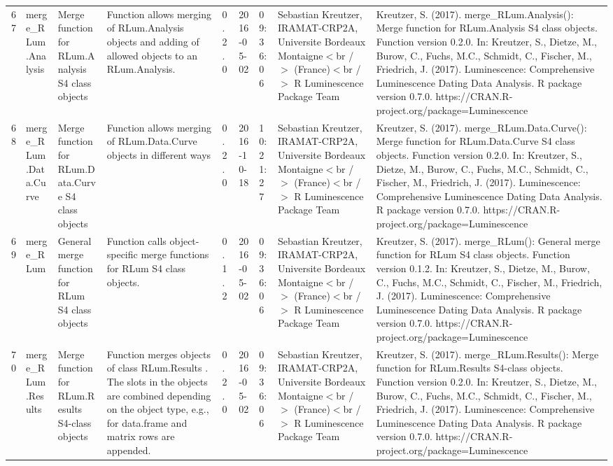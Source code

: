 \begin{table}[ht]
\begin{tabular}{rllllllll}
 \\ 
  67 & merge\_RLum.Analysis & Merge function for RLum.Analysis S4 class objects & Function allows merging of RLum.Analysis objects and adding of allowed objects to an RLum.Analysis. & 0.2.0 & 2016-05-02 & 09:36:06
 & Sebastian Kreutzer, IRAMAT-CRP2A, Universite Bordeaux Montaigne$<$br /$>$ (France)$<$br /$>$  R Luminescence Package Team & Kreutzer, S. (2017). merge\_RLum.Analysis(): Merge function for RLum.Analysis S4 class objects. Function version 0.2.0. In: Kreutzer, S., Dietze, M., Burow, C., Fuchs, M.C., Schmidt, C., Fischer, M., Friedrich, J. (2017). Luminescence: Comprehensive Luminescence Dating Data Analysis. R package version 0.7.0. https://CRAN.R-project.org/package=Luminescence
 \\ 
  68 & merge\_RLum.Data.Curve & Merge function for RLum.Data.Curve S4 class objects & Function allows merging of RLum.Data.Curve objects in different ways & 0.2.0 & 2016-10-18 & 10:21:27
 & Sebastian Kreutzer, IRAMAT-CRP2A, Universite Bordeaux Montaigne$<$br /$>$ (France)$<$br /$>$  R Luminescence Package Team & Kreutzer, S. (2017). merge\_RLum.Data.Curve(): Merge function for RLum.Data.Curve S4 class objects. Function version 0.2.0. In: Kreutzer, S., Dietze, M., Burow, C., Fuchs, M.C., Schmidt, C., Fischer, M., Friedrich, J. (2017). Luminescence: Comprehensive Luminescence Dating Data Analysis. R package version 0.7.0. https://CRAN.R-project.org/package=Luminescence
 \\ 
  69 & merge\_RLum & General merge function for RLum S4 class objects & Function calls object-specific merge functions for RLum S4 class objects. & 0.1.2 & 2016-05-02 & 09:36:06
 & Sebastian Kreutzer, IRAMAT-CRP2A, Universite Bordeaux Montaigne$<$br /$>$ (France)$<$br /$>$  R Luminescence Package Team & Kreutzer, S. (2017). merge\_RLum(): General merge function for RLum S4 class objects. Function version 0.1.2. In: Kreutzer, S., Dietze, M., Burow, C., Fuchs, M.C., Schmidt, C., Fischer, M., Friedrich, J. (2017). Luminescence: Comprehensive Luminescence Dating Data Analysis. R package version 0.7.0. https://CRAN.R-project.org/package=Luminescence
 \\ 
  70 & merge\_RLum.Results & Merge function for RLum.Results S4-class objects & Function merges objects of class  RLum.Results . The slots in the objects are combined depending on the object type, e.g., for  data.frame  and  matrix  rows are appended. & 0.2.0 & 2016-05-02 & 09:36:06
 & Sebastian Kreutzer, IRAMAT-CRP2A, Universite Bordeaux Montaigne$<$br /$>$ (France)$<$br /$>$  R Luminescence Package Team & Kreutzer, S. (2017). merge\_RLum.Results(): Merge function for RLum.Results S4-class objects. Function version 0.2.0. In: Kreutzer, S., Dietze, M., Burow, C., Fuchs, M.C., Schmidt, C., Fischer, M., Friedrich, J. (2017). Luminescence: Comprehensive Luminescence Dating Data Analysis. R package version 0.7.0. https://CRAN.R-project.org/package=Luminescence

\end{tabular}
\end{table}

